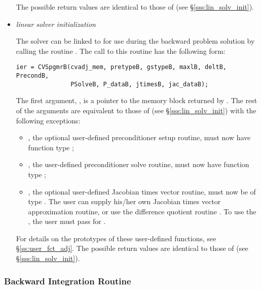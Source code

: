 \begin{itemize}
  The possible return values  are identical to those of 
  (see \S\ref{sss:lin_solv_init}).

\item {\em {\spgmr} linear solver initialization}
  
  The {\cvspgmr} solver can be linked to {\cvodes} for use during the
  backward problem solution by calling the routine . The
  call to this routine has the following form:
\begin{verbatim}
ier = CVSpgmrB(cvadj_mem, pretypeB, gstypeB, maxlB, deltB, PrecondB, 
               PSolveB, P_dataB, jtimesB, jac_dataB);
\end{verbatim}
  The first argument, , is a pointer to the memory block
  returned by . The rest of the arguments are equivalent 
  to those of  (see \S\ref{sss:lin_solv_init}) with the 
  following exceptions:
  \begin{itemize}
  \item {}, the optional user-defined preconditioner setup
    routine, must now have function type ;
  \item {}, the user-defined preconditioner solve routine,
    must now have function type ;
  \item {}, the optional user-defined Jacobian times vector 
    routine, must now be of type . The user can 
    supply his/her own Jacobian times vector approximation routine, 
    or use the difference quotient routine .
    To use the , the user must pass  
    for .
  \end{itemize}
  For details on the prototypes of these user-defined functions, 
  see \S\ref{ss:user_fct_adj}.
  The possible return values  are identical to those of 
  (see \S\ref{sss:lin_solv_init}).


\end{itemize}

\subsubsection{Backward Integration Routine}\label{sss:cvodeb}

